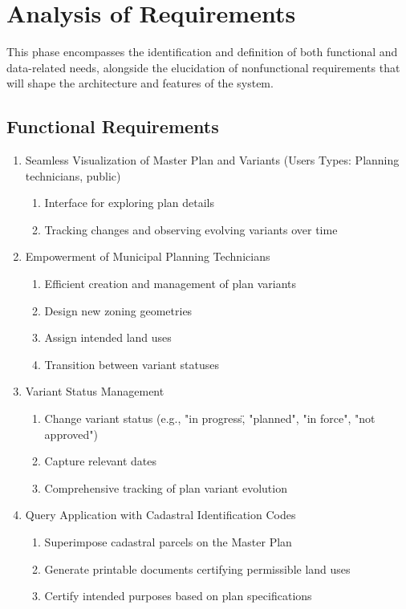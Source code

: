 
\chapter{Analysis of Requirements}
\label{ch:analysis-of-requirements}

This phase encompasses the identification and definition of both functional and data-related needs, alongside the elucidation of nonfunctional requirements that will shape the architecture and features of the system.

\section{Functional Requirements}\label{sec:functional-requirements}
\begin{enumerate}
  \item Seamless Visualization of Master Plan and Variants (Users Types: Planning technicians, public)
  \begin{enumerate}
      \item Interface for exploring plan details
      \item Tracking changes and observing evolving variants over time
  \end{enumerate}
  \item Empowerment of Municipal Planning Technicians
  \begin{enumerate}
      \item Efficient creation and management of plan variants
      \item Design new zoning geometries
      \item Assign intended land uses
      \item Transition between variant statuses
  \end{enumerate}
  \item Variant Status Management
  \begin{enumerate}
      \item Change variant status (e.g., "in progress\", "planned", "in force", "not approved")
      \item Capture relevant dates
      \item Comprehensive tracking of plan variant evolution
  \end{enumerate}
  \item Query Application with Cadastral Identification Codes
  \begin{enumerate}
      \item Superimpose cadastral parcels on the Master Plan
      \item Generate printable documents certifying permissible land uses
      \item Certify intended purposes based on plan specifications
  \end{enumerate}
\end{enumerate}


